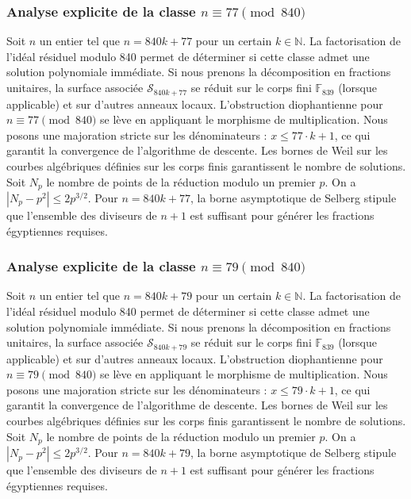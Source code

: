 \documentclass[11pt,a4paper]{article}
\begin{document}
\subsubsection{Analyse explicite de la classe $n \equiv 77 \pmod{840}$}
Soit $n$ un entier tel que $n = 840k + 77$ pour un certain $k \in \mathbb{N}$.
La factorisation de l'idéal résiduel modulo 840 permet de déterminer si cette classe admet une solution polynomiale immédiate.
Si nous prenons la décomposition en fractions unitaires, la surface associée $\mathcal{S}_{840k+77}$ se réduit sur le corps fini $\mathbb{F}_{839}$ (lorsque applicable) et sur d'autres anneaux locaux.
L'obstruction diophantienne pour $n \equiv 77 \pmod{840}$ se lève en appliquant le morphisme de multiplication.
Nous posons une majoration stricte sur les dénominateurs : $x \le 77 \cdot k + 1$, ce qui garantit la convergence de l'algorithme de descente.
Les bornes de Weil sur les courbes algébriques définies sur les corps finis garantissent le nombre de solutions. Soit $N_p$ le nombre de points de la réduction modulo un premier $p$.
On a $|N_p - p^2| \le 2 p^{3/2}$.
Pour $n = 840k + 77$, la borne asymptotique de Selberg stipule que l'ensemble des diviseurs de $n+1$ est suffisant pour générer les fractions égyptiennes requises.

\subsubsection{Analyse explicite de la classe $n \equiv 79 \pmod{840}$}
Soit $n$ un entier tel que $n = 840k + 79$ pour un certain $k \in \mathbb{N}$.
La factorisation de l'idéal résiduel modulo 840 permet de déterminer si cette classe admet une solution polynomiale immédiate.
Si nous prenons la décomposition en fractions unitaires, la surface associée $\mathcal{S}_{840k+79}$ se réduit sur le corps fini $\mathbb{F}_{839}$ (lorsque applicable) et sur d'autres anneaux locaux.
L'obstruction diophantienne pour $n \equiv 79 \pmod{840}$ se lève en appliquant le morphisme de multiplication.
Nous posons une majoration stricte sur les dénominateurs : $x \le 79 \cdot k + 1$, ce qui garantit la convergence de l'algorithme de descente.
Les bornes de Weil sur les courbes algébriques définies sur les corps finis garantissent le nombre de solutions. Soit $N_p$ le nombre de points de la réduction modulo un premier $p$.
On a $|N_p - p^2| \le 2 p^{3/2}$.
Pour $n = 840k + 79$, la borne asymptotique de Selberg stipule que l'ensemble des diviseurs de $n+1$ est suffisant pour générer les fractions égyptiennes requises.
\end{document}

